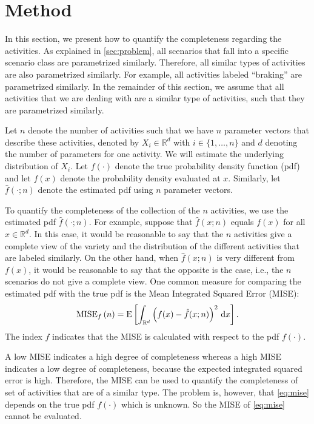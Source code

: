 \section{Method}
\label{sec:method}

In this section, we present how to quantify the completeness regarding the activities. As explained in \cref{sec:problem}, all scenarios that fall into a specific scenario class are parametrized similarly. Therefore, all similar types of activities are also parametrized similarly. For example, all activities labeled ``braking'' are parametrized similarly. In the remainder of this section, we assume that all activities that we are dealing with are a similar type of activities, such that they are parametrized similarly. 

Let $n$ denote the number of activities such that we have $n$ parameter vectors that describe these activities, denoted by $X_i \in \mathbb{R}^d$ with $i\in \{1,\ldots,n\}$ and $d$ denoting the number of parameters for one activity. We will estimate the underlying distribution of $X_i$. Let $f(\cdot)$ denote the true probability density function (pdf) and let $f(x)$ denote the probability density evaluated at $x$. Similarly, let $\hat{f}(\cdot;n)$ denote the estimated pdf using $n$ parameter vectors.

To quantify the completeness of the collection of the $n$ activities, we use the estimated pdf $\hat{f}(\cdot;n)$. For example, suppose that $\hat{f}(x;n)$ equals $f(x)$ for all $x \in \mathbb{R}^d$. In this case, it would be reasonable to say that the $n$ activities give a complete view of the variety and the distribution of the different activities that are labeled similarly. On the other hand, when $\hat{f}(x;n)$ is very different from $f(x)$, it would be reasonable to say that the opposite is the case, i.e., the $n$ scenarios do not give a complete view. One common measure for comparing the estimated pdf with the true pdf is the Mean Integrated Squared Error (MISE):
\begin{equation}
	\label{eq:mise}
	\textup{MISE}_{f}\left( n \right) = \textup{E} \left[ \int_{\mathbb{R}^d} \left( f(x) - \hat{f}(x;n) \right)^2 \mathrm{\,d} x \right].
\end{equation}
The index $f$ indicates that the MISE is calculated with respect to the pdf $f(\cdot)$.

A low MISE indicates a high degree of completeness whereas a high MISE indicates a low degree of completeness, because the expected integrated squared error is high. Therefore, the MISE can be used to quantify the completeness of set of activities that are of a similar type. The problem is, however, that \cref{eq:mise} depends on the true pdf $f(\cdot)$ which is unknown. So the MISE of \cref{eq:mise} cannot be evaluated.

